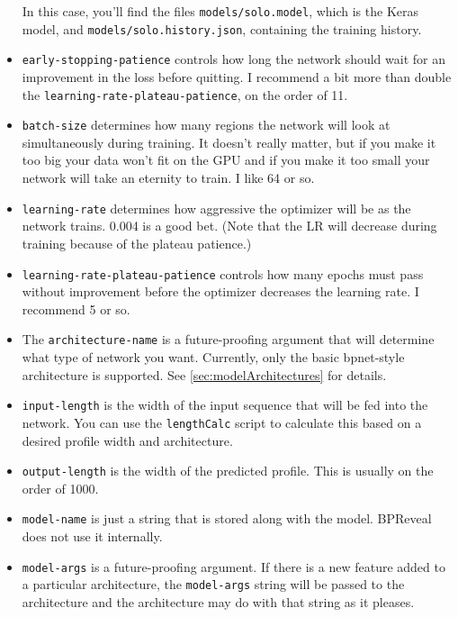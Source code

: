 \documentclass{article}
\begin{document}
\begin{itemize}
\begin{sloppypar}
        In this case, you'll find the files \texttt{models/solo.model}, which
        is the Keras model, and \texttt{models/solo.history.json}, containing
        the training history.
    \end{sloppypar}
    \item \texttt{early-stopping-patience} controls how long the network should
        wait for an improvement in the loss before quitting.
        I recommend a bit more than double the
        \texttt{learning-rate-plateau-patience}, on the order of 11.
    \item \texttt{batch-size} determines how many regions the network will look
        at simultaneously during training.
        It doesn't really matter, but if you make it too big your data won't fit
        on the GPU and if you make it too small your network will take an
        eternity to train. I like 64 or so.
    \item \texttt{learning-rate} determines how aggressive the optimizer will be
        as the network trains. 0.004 is a good bet.
        (Note that the LR will decrease during training because of the plateau
        patience.)
    \item \texttt{learning-rate-plateau-patience} controls how many epochs must
        pass without improvement before the optimizer decreases the learning
        rate.
        I recommend 5 or so.
    \item The \texttt{architecture-name} is a future-proofing argument that
        will determine what type of network you want.
        Currently, only the basic bpnet-style architecture is supported.
        See \ref{sec:modelArchitectures} for details.
    \item \texttt{input-length} is the width of the input sequence that will be
        fed into the network.
        You can use the \texttt{lengthCalc} script to calculate this based on
        a desired profile width and architecture.
    \item \texttt{output-length} is the width of the predicted profile.
        This is usually on the order of 1000.
    \item \texttt{model-name} is just a string that is stored along with the
        model.
        BPReveal does not use it internally.
    \item \texttt{model-args} is a future-proofing argument.
        If there is a new feature added to a particular architecture, the
        \texttt{model-args} string will be passed to the architecture and the
        architecture may do with that string as it pleases.

\end{itemize}
\end{document}
